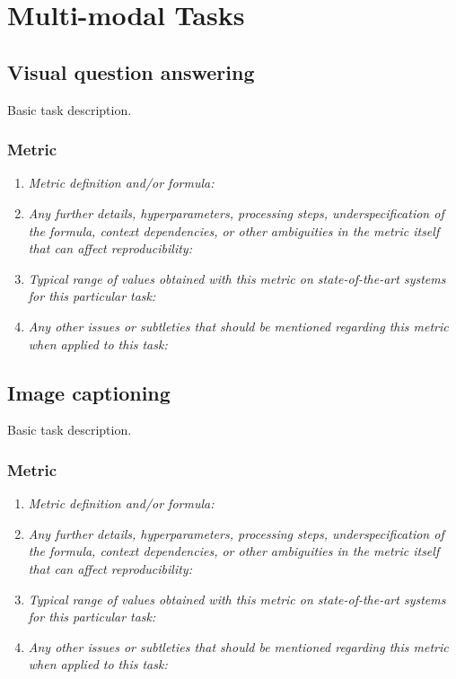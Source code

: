 \documentclass[a4paper,11pt]{article}
\begin{document}
\clearpage
\section{Multi-modal Tasks}
    \subsection{Visual question answering}
        Basic task description.
        \subsubsection{Metric}
            \begin{enumerate}[label=\alph*.]
                \item \textit{Metric definition and/or formula:}
                \bigskip
                \item \textit{Any further details, hyperparameters, processing steps, underspecification of the formula, context dependencies, or other ambiguities in the metric itself that can affect reproducibility:}
                \bigskip
                \item \textit{Typical range of values obtained with this metric on state-of-the-art systems for this particular task:}
                \bigskip
                \item \textit{Any other issues or subtleties that should be mentioned regarding this metric when applied to this task:}
                \bigskip
            \end{enumerate}

    \subsection{Image captioning}
        Basic task description.
        \subsubsection{Metric}
            \begin{enumerate}[label=\alph*.]
                \item \textit{Metric definition and/or formula:}
                \bigskip
                \item \textit{Any further details, hyperparameters, processing steps, underspecification of the formula, context dependencies, or other ambiguities in the metric itself that can affect reproducibility:}
                \bigskip
                \item \textit{Typical range of values obtained with this metric on state-of-the-art systems for this particular task:}
                \bigskip
                \item \textit{Any other issues or subtleties that should be mentioned regarding this metric when applied to this task:}
                \bigskip
            \end{enumerate}
\end{document}
